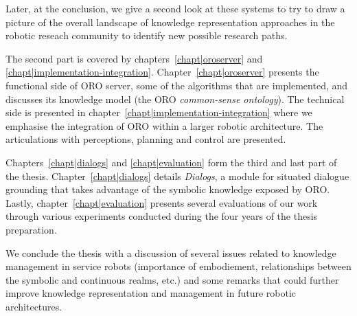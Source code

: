 Later, at the conclusion, we give a second look at these systems to try to
draw a picture of the overall landscape of knowledge representation approaches
in the robotic reseach community to identify new possible research paths.

The second part is covered by chapters~\ref{chapt|oroserver} and
\ref{chapt|implementation-integration}. Chapter~\ref{chapt|oroserver} presents
the functional side of ORO server, some of the algorithms that are
implemented, and discusses its knowledge model (the ORO \emph{common-sense
ontology}). The technical side is presented in
chapter~\ref{chapt|implementation-integration} where we emphasise the
integration of ORO within a larger robotic architecture. The articulations with
perceptions, planning and control are presented.

Chapters~\ref{chapt|dialogs} and \ref{chapt|evaluation} form the third and last
part of the thesis. Chapter~\ref{chapt|dialogs} details \emph{Dialogs}, a
module for situated dialogue grounding that takes advantage of the symbolic
knowledge exposed by ORO. Lastly, chapter~\ref{chapt|evaluation} presents
several evaluations of our work through various experiments conducted during
the four years of the thesis preparation.

We conclude the thesis with a discussion of several issues related to knowledge
management in service robots (importance of embodiement, relationships between
the symbolic and continuous realms, etc.) and some remarks that could further
improve knowledge representation and management in future robotic
architectures.

